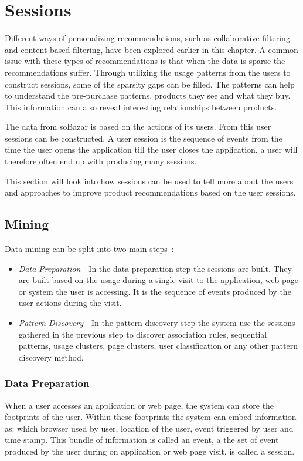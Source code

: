 
\section{Sessions}
    Different ways of personalizing recommendations, such as collaborative filtering and content based filtering, have been explored earlier in this chapter.
    A common issue with these types of recommendations is that when the data is sparse the recommendations suffer.
    Through utilizing the usage patterns from the users to construct sessions, some of the sparsity gaps can be filled.
    The patterns can help to understand the pre-purchase patterns, products they see and what they buy.
    This information can also reveal interesting relationships between products.

    The data from soBazar is based on the actions of its users.
    From this user sessions can be constructed.
    A user session is the sequence of events from the time the user opens the application till the user closes the application, a user will therefore often end up with producing many sessions.

    This section will look into how sessions can be used to tell more about the users and approaches to improve product recommendations based on the user sessions.


\subsection{Mining}
    Data mining can be split into two main steps~\cite{Cho2002329}:
    \begin{itemize}
        \item \emph{Data Preparation} - In the data preparation step the sessions are built. They are built based on the usage during a single visit to the application, web page or system the user is accessing. It is the sequence of events produced by the user actions during the visit.
        \item \emph{Pattern Discovery} - In the pattern discovery step the system use the sessions gathered in the previous step to discover association rules, sequential patterns, usage clusters, page clusters, user classification or any other pattern discovery method.
    \end{itemize}

\subsubsection{Data Preparation} %
    \label{par:Data_Preparation}
    When a user accesses an application or web page, the system can store the footprints of the user.
    Within these footprints the system can embed information as: which browser used by user, location of the user, event triggered by user and time stamp.
    This bundle of information is called an event, a the set of event produced by the user during on application or web page visit, is called a session.

